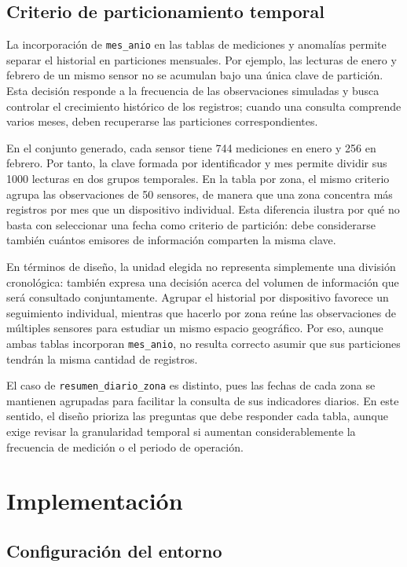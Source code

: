 \documentclass[conference]{IEEEtran}
\begin{document}
\subsection{Criterio de particionamiento temporal}

La incorporación de \texttt{mes\_anio} en las tablas de mediciones y anomalías permite separar el historial en particiones mensuales. Por ejemplo, las lecturas de enero y febrero de un mismo sensor no se acumulan bajo una única clave de partición. Esta decisión responde a la frecuencia de las observaciones simuladas y busca controlar el crecimiento histórico de los registros; cuando una consulta comprende varios meses, deben recuperarse las particiones correspondientes.

En el conjunto generado, cada sensor tiene 744 mediciones en enero y 256 en febrero. Por tanto, la clave formada por identificador y mes permite dividir sus 1000 lecturas en dos grupos temporales. En la tabla por zona, el mismo criterio agrupa las observaciones de 50 sensores, de manera que una zona concentra más registros por mes que un dispositivo individual. Esta diferencia ilustra por qué no basta con seleccionar una fecha como criterio de partición: debe considerarse también cuántos emisores de información comparten la misma clave.

En términos de diseño, la unidad elegida no representa simplemente una división cronológica: también expresa una decisión acerca del volumen de información que será consultado conjuntamente. Agrupar el historial por dispositivo favorece un seguimiento individual, mientras que hacerlo por zona reúne las observaciones de múltiples sensores para estudiar un mismo espacio geográfico. Por eso, aunque ambas tablas incorporan \texttt{mes\_anio}, no resulta correcto asumir que sus particiones tendrán la misma cantidad de registros.

El caso de \texttt{resumen\_diario\_zona} es distinto, pues las fechas de cada zona se mantienen agrupadas para facilitar la consulta de sus indicadores diarios. En este sentido, el diseño prioriza las preguntas que debe responder cada tabla, aunque exige revisar la granularidad temporal si aumentan considerablemente la frecuencia de medición o el periodo de operación.

\section{Implementación}

\subsection{Configuración del entorno}
\end{document}
